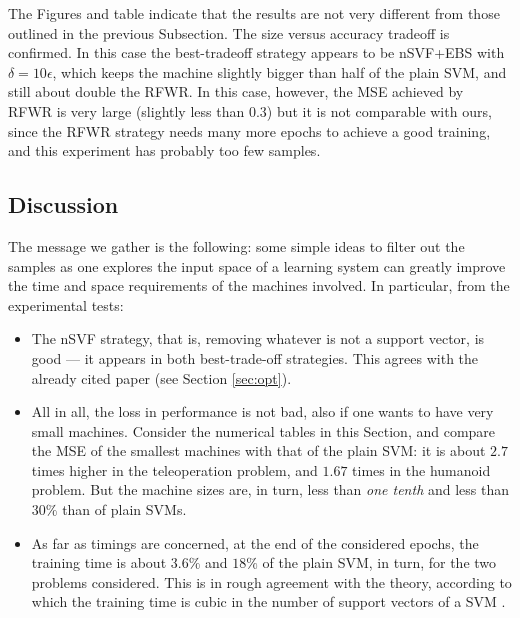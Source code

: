 \documentclass[conference]{IEEEtran}
\begin{document}
The Figures and table indicate that the results are not very different
from those outlined in the previous Subsection. The size versus
accuracy tradeoff is confirmed. In this case the best-tradeoff
strategy appears to be nSVF+EBS with $\delta=10\epsilon$, which keeps
the machine slightly bigger than half of the plain SVM, and still
about double the RFWR. In this case, however, the MSE achieved by RFWR
is very large (slightly less than $0.3$) but it is not comparable with
ours, since the RFWR strategy needs many more epochs to achieve a good
training, and this experiment has probably too few samples.

\subsection{Discussion}

The message we gather is the following: some simple ideas to filter
out the samples as one explores the input space of a learning system
can greatly improve the time and space requirements of the machines
involved. In particular, from the experimental tests:

\begin{itemize}

  \item The nSVF strategy, that is, removing whatever is not a support
    vector, is good --- it appears in both best-trade-off
    strategies. This agrees with the already cited paper
    \cite{syed99incremental} (see Section \ref{sec:opt}).

  \item All in all, the loss in performance is not bad, also if one
    wants to have very small machines. Consider the numerical tables
    in this Section, and compare the MSE of the smallest machines
    with that of the plain SVM: it is about $2.7$ times higher in the
    teleoperation problem, and $1.67$ times in the humanoid
    problem. But the machine sizes are, in turn, less than \emph{one
    tenth} and less than $30\%$ than of plain SVMs.

  \item As far as timings are concerned, at the end of the considered
    epochs, the training time is about $3.6\%$ and $18\%$ of the plain
    SVM, in turn, for the two problems considered. This is in rough
    agreement with the theory, according to which the training time is
    cubic in the number of support vectors of a SVM
    \cite{KeerthiCDC06}.

\end{itemize}
\end{document}
